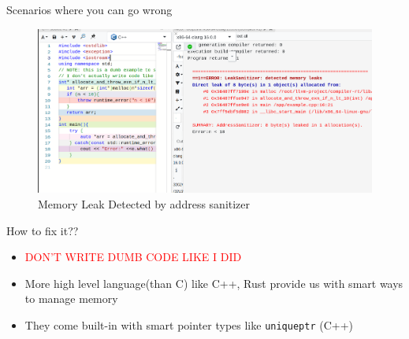 \documentclass[
  10pt,
  ignorenonframetext,
]{beamer}
\providecommand{\tightlist}{%
  \setlength{\itemsep}{0pt}\setlength{\parskip}{0pt}}
\begin{document}
\begin{frame}{Scenarios where you can go wrong}
\protect\hypertarget{scenarios-where-you-can-go-wrong-1}{}
\begin{figure}
\centering
\includegraphics[width=1\textwidth,height=\textheight]{images/./leak_detected.png}
\caption{Memory Leak Detected by address
sanitizer}
\end{figure}
\end{frame}

\begin{frame}{How to fix it??}
\protect\hypertarget{how-to-fix-it}{}
\pause

\begin{itemize}
\tightlist
\item
  \textcolor{red}{DON'T WRITE DUMB CODE LIKE I DID}
\end{itemize}

\pause

\begin{itemize}
\tightlist
\item
  More high level language(than C) like C++, Rust
  provide us with smart ways to manage memory
\end{itemize}

\pause

\begin{itemize}
\tightlist
\item
  They come built-in with smart pointer types like
  \texttt{unique\textunderscore ptr} (C++)
\end{itemize}
\end{frame}
\end{document}
